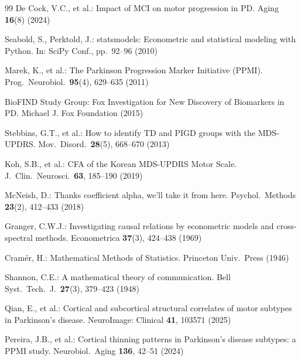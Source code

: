 \documentclass[runningheads]{llncs}
\begin{document}
\begin{thebibliography}{99}
De Cock, V.C., et al.: Impact of MCI on motor progression in PD. Aging \textbf{16}(8) (2024)

Seabold, S., Perktold, J.: statsmodels: Econometric and statistical modeling with Python. In: SciPy Conf., pp.\ 92--96 (2010)

Marek, K., et al.: The Parkinson Progression Marker Initiative (PPMI). Prog.\ Neurobiol.\ \textbf{95}(4), 629--635 (2011)

BioFIND Study Group: Fox Investigation for New Discovery of Biomarkers in PD. Michael J. Fox Foundation (2015)

Stebbins, G.T., et al.: How to identify TD and PIGD groups with the MDS-UPDRS. Mov.\ Disord.\ \textbf{28}(5), 668--670 (2013)

Koh, S.B., et al.: CFA of the Korean MDS-UPDRS Motor Scale. J.\ Clin.\ Neurosci.\ \textbf{63}, 185--190 (2019)

McNeish, D.: Thanks coefficient alpha, we'll take it from here. Psychol.\ Methods \textbf{23}(2), 412--433 (2018)

Granger, C.W.J.: Investigating causal relations by econometric models and cross-spectral methods. Econometrica \textbf{37}(3), 424--438 (1969)

Cram\'{e}r, H.: Mathematical Methods of Statistics. Princeton Univ.\ Press (1946)

Shannon, C.E.: A mathematical theory of communication. Bell Syst.\ Tech.\ J.\ \textbf{27}(3), 379--423 (1948)

Qian, E., et al.: Cortical and subcortical structural correlates of motor subtypes in Parkinson's disease. NeuroImage: Clinical \textbf{41}, 103571 (2025)

Pereira, J.B., et al.: Cortical thinning patterns in Parkinson's disease subtypes: a PPMI study. Neurobiol.\ Aging \textbf{136}, 42--51 (2024)

\end{thebibliography}
\end{document}
